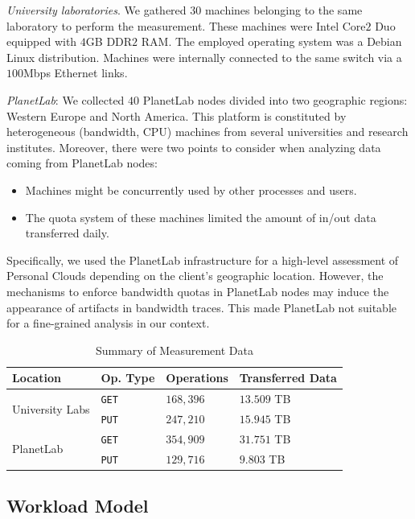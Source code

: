 \textit{University laboratories}. We gathered $30$ machines
belonging to the same laboratory to perform the measurement.
These machines were Intel Core$2$ Duo equipped with $4$GB DDR$2$ RAM. 
The employed operating system was a Debian Linux distribution. 
Machines were internally connected to the same switch via a $100$Mbps Ethernet links.

\textit{PlanetLab}: We collected $40$ PlanetLab nodes divided into
two geographic regions: Western Europe and North America. 
This platform is constituted by heterogeneous (bandwidth, CPU) machines from several
universities and research institutes. Moreover, there were two points to consider
when analyzing data coming from PlanetLab nodes: 
\begin{itemize}
	\item Machines might be concurrently used by other processes and users.
	\item The quota system of these machines limited the amount of in/out data transferred daily. 
\end{itemize}

Specifically, we used the PlanetLab infrastructure for
a high-level assessment of Personal Clouds depending on the 
client's geographic location. 
However, the mechanisms to enforce bandwidth quotas
in PlanetLab nodes may induce the appearance of artifacts 
in bandwidth traces. This made PlanetLab not 
suitable for a fine-grained analysis in our context.
   
\begin{table}%
\begin{center}

\begin{tabular}{|l|l|l|l|}
\hline
Location & Op. Type & Operations & Transferred Data \\ \hline
\multirow{2}{*}{University Labs}
 & \texttt{GET} & $168,396$ & $13.509$ TB\\
 & \texttt{PUT} & $247,210$ & $15.945$ TB\\ \hline
\multirow{2}{*}{PlanetLab}
 & \texttt{GET} & $354,909$ & $31.751$ TB\\
 & \texttt{PUT} & $129,716$ & $9.803$ TB\\ \hline
\end{tabular}
\caption{Summary of Measurement Data}
\vspace{-9mm}
\label{tab:measurement_data}
\end{center}
\end{table}

\subsection{Workload Model} 

